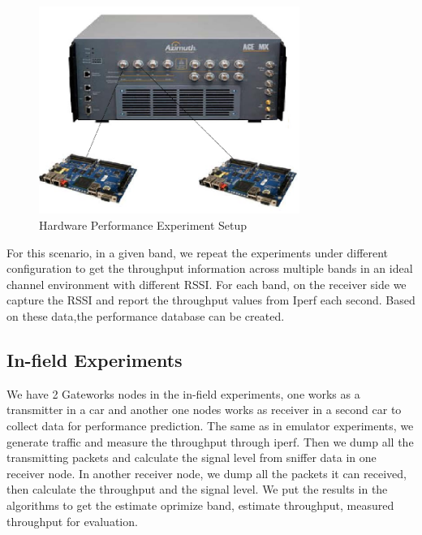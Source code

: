 \begin{figure}
\centering
\includegraphics[width=85mm]{figure/ideal_emulator}
\caption{Hardware Performance Experiment Setup}
\label{fig:multiframe}
\end{figure}

For this scenario, in a given band, we repeat the experiments under different configuration to get the throughput information across multiple bands in an ideal channel environment with different RSSI.
For each band, on the receiver side we capture the RSSI and report the throughput values from Iperf \cite{Iperf} each second. Based on these data,the performance database can be created.


\subsection{In-field Experiments}
We have 2 Gateworks nodes in the in-field experiments, one works as a transmitter in a car and another one nodes works as receiver in a second car to collect data for performance prediction.
The same as in emulator experiments, we generate traffic and measure the throughput through iperf. Then we dump all the transmitting packets and calculate the signal level from sniffer data in one receiver node. 
In another receiver node, we dump all the packets it can received, then calculate the throughput and the signal level. We put the results in the algorithms to get the estimate oprimize band, estimate throughput, measured throughput for evaluation.


